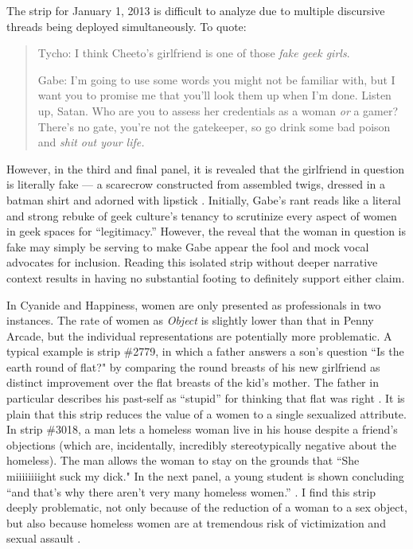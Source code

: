 \documentclass[man,12pt]{apa6}
\begin{document}
The strip for January 1, 2013 is difficult to analyze due to multiple discursive threads being deployed simultaneously. To quote:
\begin{quote}
Tycho: I think Cheeto's girlfriend is one of those \emph{fake geek girls}.

Gabe: I'm going to use some words you might not be familiar with, but I want you to promise me that you'll look them up when I'm done. Listen up, Satan. Who are you to assess her credentials as a woman \emph{or} a gamer? There's no gate, you're not the gatekeeper, so go drink some bad poison and \emph{shit out your life.}
\end{quote}

However, in the third and final panel, it is revealed that the girlfriend in question is literally fake --- a scarecrow constructed from assembled twigs, dressed in a batman shirt and adorned with lipstick \cite{pa}. Initially, Gabe's rant reads like a literal and strong rebuke of geek culture's tenancy to scrutinize every aspect of women in geek spaces for ``legitimacy.'' However, the reveal that the woman in question is fake may simply be serving to make Gabe appear the fool and mock vocal advocates for inclusion. Reading this isolated strip without deeper narrative context results in having no substantial footing to definitely support either claim.

In Cyanide and Happiness, women are only presented as professionals in two instances. The rate of women as \emph{Object} is slightly lower than that in Penny Arcade, but the individual representations are potentially more problematic. A typical example is strip \#2779, in which a father answers a son's question ``Is the earth round of flat?" by comparing the round breasts of his new girlfriend as distinct improvement over the flat breasts of the kid's mother. The father in particular describes his past-self as ``stupid'' for thinking that flat was right \cite{ch}. It is plain that this strip reduces the value of a women to a single sexualized attribute. In strip \#3018, a man lets a homeless woman live in his house despite a friend's objections (which are, incidentally, incredibly stereotypically negative about the homeless). The man allows the woman to stay on the grounds that ``She miiiiiiiight suck my dick." In the next panel, a young student is shown concluding ``and that's why there aren't very many homeless women.'' \cite{ch}. I find this strip deeply problematic, not only because of the reduction of a woman to a sex object, but also because homeless women are at tremendous risk of victimization and sexual assault \cite{wenzel2000antecedents}.
\end{document}
